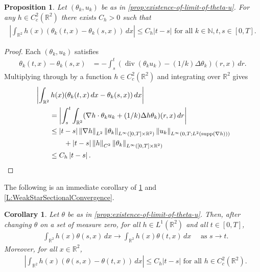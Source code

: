 \documentclass[11pt,reqno,xcolor=svgnames]{amsart}
\def\R{{\mathbb R}}
\def\N{{\mathbb N}}
\theoremstyle{plain}
\newtheorem{cor}[theorem]{Corollary}
\newtheorem{prop}[theorem]{Proposition}
\theoremstyle{definition}
\theoremstyle{plain}
\theoremstyle{remark}
\newcommand{\abs}[1]{\left\vert#1\right\vert}
\DeclareMathOperator{\dv}{div}
\DeclareMathOperator{\supp}{supp}
\newcommand{\iny}{\ensuremath{\infty}}
\newcommand{\grad}{\ensuremath{\nabla}}
\newcommand{\norm}[1]{\ensuremath{\left\Vert #1 \right\Vert}}
\begin{document}
    \begin{prop}\label{P:WeakTimeContinuityOfthetaSeq}
        Let $(\theta_k,u_k)$ be as in \cref{prop:existence-of-limit-of-theta-u}.
        For any $h \in C_c^2(\R^2)$ there exists $C_h > 0$ such that
        \begin{align*}
            \abs{\int_{\R^2} h(x) (\theta_k(t, x) - \theta_k(s, x)) \, dx}
                \le C_h \abs{t - s}
                \text{ for all } k \in \N, t, s \in [0, T].
        \end{align*}
    \end{prop}
    \begin{proof}
        Each $(\theta_k,u_k)$ satisfies
        \begin{align*}
            \theta_k(t, x) - \theta_k(s, x)
                &= -\int_s^t( \dv (\theta_k u_k) - (1/k)\Delta\theta_k)(r, x) \, dr.
        \end{align*}
        Multiplying through by a function $h \in C^2_c(\R^2)$ and integrating over $\R^2$ gives
        \begin{align*}
            &\abs{\int_{\R^2} h(x) (\theta_k(t, x) \, dx - \theta_k(s, x)) \, dx} \\
                &\qquad= \abs{\int_s^t\int_{\R^2} (\nabla h \cdot  \theta_k u_k + (1/k)\Delta h \theta_k)(r,x) \, dr} \\
            &\qquad
            \le \abs{t - s}
                \norm{\nabla h}_{L^2} \norm{\theta_k}_{L^\iny([0, T] \times \R^2)}
                    \norm{u_k}_{L^\iny(0, T; L^2(\supp(\grad h)))} \\
            &\qquad\qquad
                +\abs{t - s} \norm{h}_{C^2} \norm{\theta_k}_{L^\iny([0, T] \times \R^2)} \\
            &\qquad
            \le C_h \abs{t - s}.
            \qedhere
        \end{align*}
    \end{proof}
The following is an immediate corollary of \cref{P:WeakTimeContinuityOfthetaSeq} and \cref{L:WeakStarSectionalConvergence}.
\begin{cor}\label{corollarythetatimecont}
Let $\theta$ be as in \cref{prop:existence-of-limit-of-theta-u}.  Then, after changing $\theta$ on a set of measure zero, for all $h\in L^1(\R^2)$ and all $t\in [0,T]$,
\begin{equation*}
\begin{split}
&\int_{\R^2} h(x) \theta(s,x) \, dx \rightarrow \int_{\R^2} h(x) \theta(t,x) \, dx \quad\text{  as }s\rightarrow t.
\end{split}
\end{equation*}
Moreover, for all $x \in \R^2$,
\begin{equation*}
\begin{split}
& \abs{\int_{\R^2} h(x) (\theta(s, x) - \theta(t, x)) \, dx}
                 \le C_h \abs{t - s}
                 \text{ for all } h \in C_c^2(\R^2).
\end{split}
\end{equation*}
\end{cor}
\end{document}
